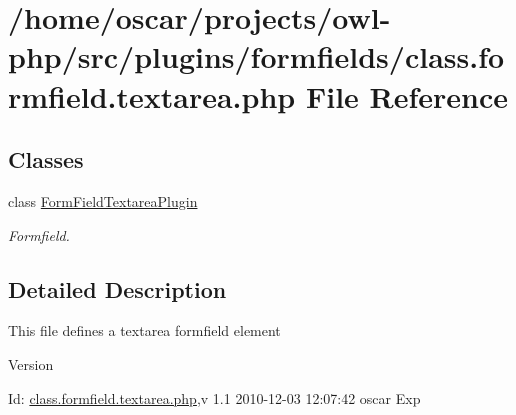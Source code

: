 \section{/home/oscar/projects/owl-\/php/src/plugins/formfields/class.formfield.textarea.php File Reference}
\label{class_8formfield_8textarea_8php}
\subsection*{Classes}
\begin{DoxyCompactItemize}
\item 
class \hyperlink{classFormFieldTextareaPlugin}{FormFieldTextareaPlugin}
\begin{DoxyCompactList}\small\item\em Formfield. \item\end{DoxyCompactList}\end{DoxyCompactItemize}


\subsection{Detailed Description}
This file defines a textarea formfield element \begin{DoxyVersion}{Version}

\end{DoxyVersion}
\begin{DoxyParagraph}{Id:}
\hyperlink{class_8formfield_8textarea_8php}{class.formfield.textarea.php},v 1.1 2010-\/12-\/03 12:07:42 oscar Exp 
\end{DoxyParagraph}
